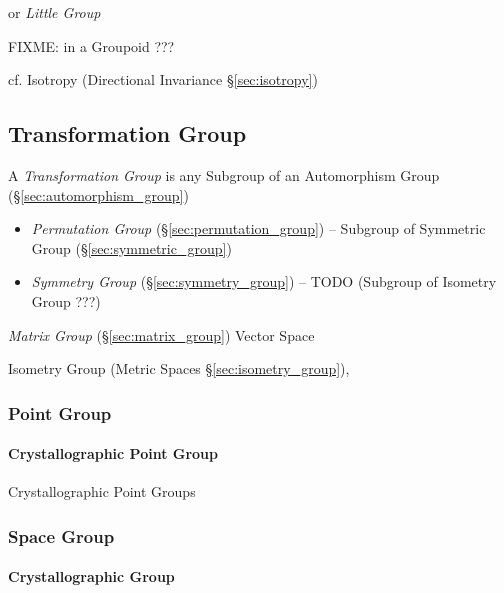 or \emph{Little Group}

FIXME: in a Groupoid ???

cf. Isotropy (Directional Invariance \S\ref{sec:isotropy})



\subsection{Transformation Group}\label{sec:transformation_group}

A \emph{Transformation Group} is any Subgroup of an Automorphism Group
(\S\ref{sec:automorphism_group})

\begin{itemize}
  \item \emph{Permutation Group} (\S\ref{sec:permutation_group}) -- Subgroup of
    Symmetric Group (\S\ref{sec:symmetric_group})
  \item \emph{Symmetry Group} (\S\ref{sec:symmetry_group}) -- TODO (Subgroup of
    Isometry Group ???)
\end{itemize}

\emph{Matrix Group} (\S\ref{sec:matrix_group}) Vector Space

\fist Isometry Group (Metric Spaces \S\ref{sec:isometry_group}),



\subsubsection{Point Group}\label{sec:point_group}

\paragraph{Crystallographic Point Group}\label{sec:crystallographic_point_group}
\hfill

Crystallographic Point Groups



\subsubsection{Space Group}\label{sec:space_group}

\paragraph{Crystallographic Group}\label{sec:crystallographic_group}\hfill

